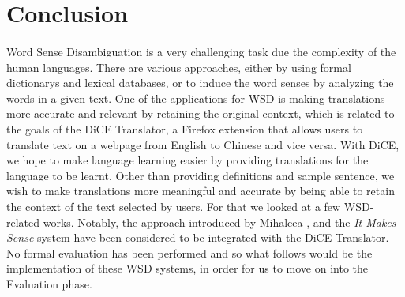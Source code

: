 \documentclass[12 pt]{article}
\begin{document}
\section{Conclusion}
\label{conclusion}
\paragraph{}
Word Sense Disambiguation is a very challenging task due the complexity of the human languages. There are various approaches, either by using formal dictionarys and lexical databases, or to induce the word senses by analyzing the words in a given text. One of the applications for WSD is making translations more accurate and relevant by retaining the original context, which is related to the goals of the DiCE Translator, a Firefox extension that allows users to translate text on a webpage from English to Chinese and vice versa. With DiCE, we hope to make language learning easier by providing translations for the language to be learnt. Other than providing definitions and sample sentence, we wish to make translations more meaningful and accurate by being able to retain the context of the text selected by users. For that we looked at a few WSD-related works. Notably, the approach introduced by Mihalcea \cite{wikipedia}, and the \textit{It Makes Sense} \cite{itmakessense} system have been considered to be integrated with the DiCE Translator. No formal evaluation has been performed and so what follows would be the implementation of these WSD systems, in order for us to move on into the Evaluation phase.
\end{document}
